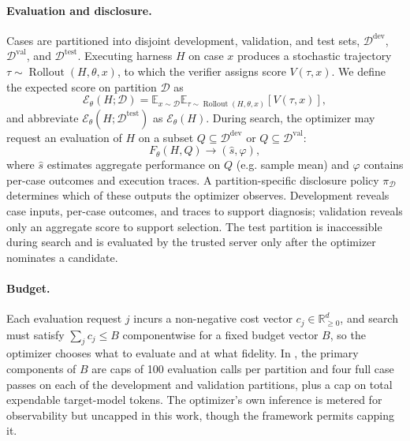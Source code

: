 \paragraph{Evaluation and disclosure.}
Cases are partitioned into disjoint development, validation, and test sets,
$\mathcal{D}^{\mathrm{dev}}$, $\mathcal{D}^{\mathrm{val}}$, and
$\mathcal{D}^{\mathrm{test}}$. Executing harness $H$ on case $x$ produces a
stochastic trajectory
$\tau\sim\operatorname{Rollout}(H,\theta,x)$, to which the verifier assigns
score $V(\tau,x)$. We define the expected score on partition $\mathcal{D}$ as
\begin{equation}
\mathcal{E}_{\theta}(H;\mathcal{D}) = 
\mathbb{E}_{x\sim\mathcal{D}}
\mathbb{E}_{\tau\sim\operatorname{Rollout}(H,\theta,x)}
\left[V(\tau,x)\right],
\end{equation}
and abbreviate $\mathcal{E}_{\theta}(H;\mathcal{D}^{\mathrm{test}})$ as
$\mathcal{E}_{\theta}(H)$. During search, the optimizer may request an
evaluation of $H$ on a subset
$Q\subseteq\mathcal{D}^{\mathrm{dev}}$ or
$Q\subseteq\mathcal{D}^{\mathrm{val}}$:
\begin{equation}
F_{\theta}(H,Q)\longrightarrow(\hat{s},\varphi),
\end{equation}
where $\hat{s}$ estimates aggregate performance on $Q$ (e.g. sample mean) and $\varphi$ contains per-case
outcomes and execution traces. A partition-specific disclosure policy
$\pi_{\mathcal{D}}$ determines which of these outputs the optimizer observes.
Development reveals case inputs, per-case outcomes, and traces to support
diagnosis; validation reveals only an aggregate score to support selection.
The test partition is inaccessible during search and is evaluated by the
trusted server only after the optimizer nominates a candidate.


\paragraph{Budget.}
Each evaluation request $j$ incurs a non-negative cost vector
$c_j\in\mathbb{R}_{\geq 0}^{d}$, and search must satisfy $\sum_j c_j\leq B$
componentwise for a fixed budget vector $B$, so the optimizer chooses what to
evaluate and at what fidelity. In \heb, the primary components of $B$ are caps
of 100 evaluation calls per partition and four full case passes on each of the
development and validation partitions, plus a cap on total expendable
target-model tokens. The optimizer's own inference is metered for observability
but uncapped in this work, though
the framework permits capping it.

